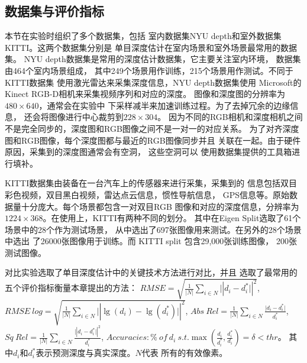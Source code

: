 \subsection{数据集与评价指标}
本节在实验时组织了多个数据集，包括
室内数据集NYU depth和室外数据集KITTI。这两个数据集分别是
单目深度估计在室内场景和室外场景最常用的数据集。
NYU depth数据集是常用的深度估计数据集，它主要关注室内环境，
数据集由464个室内场景组成，
其中249个场景用作训练，215个场景用作测试。不同于KITTI数据集
使用激光雷达来采集深度信息，NYU depth数据集使用
Microsoft的Kinect RGB-D相机来采集视频序列和对应的深度。
图像和深度图的分辨率为$480 \times 640$，通常会在实验中
下采样减半来加速训练过程。为了去掉冗余的边缘信息，
还会将图像进行中心裁剪到$228 \times 304$。
因为不同的RGB相机和深度相机之间
不是完全同步的，深度图和RGB图像之间不是一对一的对应关系。
为了对齐深度图和RGB图像，每个深度图都与最近的RGB图像同步并且
关联在一起。由于硬件原因，采集到的深度图通常会有空洞，
这些空洞可以
使用数据集提供的工具箱进行填补。

KITTI数据集由装备在一台汽车上的传感器来进行采集，采集到的
信息包括双目彩色视频，双目黑白视频，雷达点云信息，惯性导航信息，
GPS信息等。原始数据量十分庞大。每个场景都包含一对双目RGB
图像和对应的深度信息，分辨率为$1224 \times 368$。在使用上，KITTI有两种不同的划分。
其中在Eigen Split选取了61个场景中的28个作为测试场景，
从中选出了697张图像用来测试。在另外的28个场景中选出
了26000张图像用于训练。而 KITTI split 包含29,000张训练图像，
200张测试图像。

对比实验选取了单目深度估计中的关键技术方法进行对比，并且
选取了最常用的五个评价指标\cite{eigen2014depth}衡量本章提出的方法：
$
 RMSE=\sqrt{\frac{1}{\lvert N \rvert} \sum\nolimits_{i\in N}\lvert|d_i - d_i^*\rvert|^2} 
$,
$
  RMSE \ log = \sqrt{\frac{1}{\lvert N \rvert}\sum\nolimits_{i\in N}\lvert| \lg(d_i) - \lg(d_i^*) \rvert|^2}
$,
$
  Abs \ Rel=\frac{1}{\lvert N \rvert}\sum\nolimits_{i \in N}\frac{\lvert d_i - d_i^* \rvert}{d_i^*}
$,
$
  Sq \ Rel=\frac{1}{\lvert N \rvert}\sum\nolimits_{i \in N}\frac{\lvert| d_i - d_i^* \rvert|^2}{d_i^*}
$,
$
  Accuracies:\% \ of \ d_i \ s.t. \max(\frac{d_i}{d_i^*},\frac{d_i^*}{d_i})=\delta < thr 
$。
其中$d_i$和$d_i^*$表示预测深度与真实深度。$N$代表
所有的有效像素。
